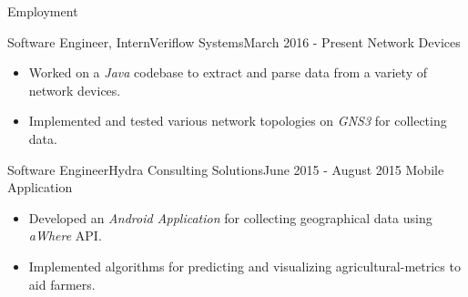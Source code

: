 \documentclass[]{Gohar_CV_Jobs}
\begin{document}
    \makeheader
    
    \begin{cvsection}{Employment}
        \begin{cvsubsection}{Software Engineer, Intern}{Veriflow Systems}{March 2016 - Present}
            Network Devices
            \begin{itemize}
                \item Worked on a \textit{Java} codebase to extract and parse data from a variety of network devices.
                \item Implemented and tested various network topologies on \textit{GNS3} for collecting data.
            \end{itemize}
        \end{cvsubsection}
        \begin{cvsubsection}{Software Engineer}{Hydra Consulting Solutions}{June 2015 - August 2015}
            Mobile Application
            \begin{itemize}
                \item Developed an \textit{Android Application} for collecting geographical data using \textit{aWhere} API.
                \item Implemented algorithms for predicting and visualizing agricultural-metrics to aid farmers.
            \end{itemize}
        \end{cvsubsection}
    \end{cvsection}
\end{document}
